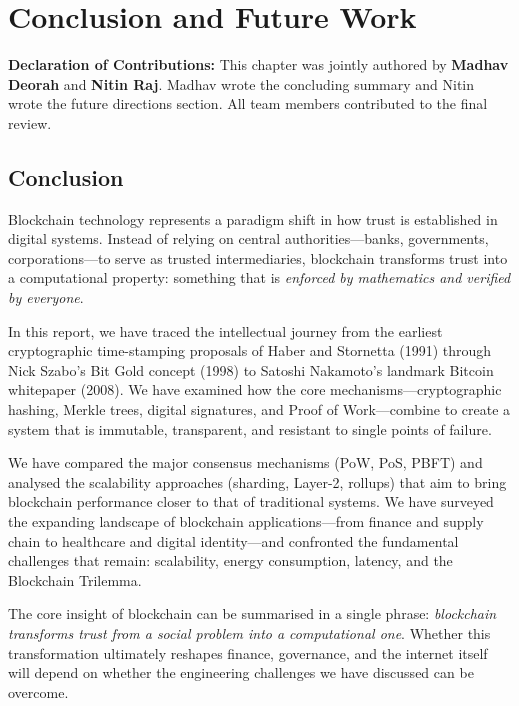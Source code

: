 \chapter{Conclusion and Future Work}
\label{ch:conclusion}

\noindent\textbf{Declaration of Contributions:} This chapter was jointly authored by \textbf{Madhav Deorah} and \textbf{Nitin Raj}. Madhav wrote the concluding summary and Nitin wrote the future directions section. All team members contributed to the final review.

\bigskip

\section{Conclusion}

Blockchain technology represents a paradigm shift in how trust is established in digital systems. Instead of relying on central authorities---banks, governments, corporations---to serve as trusted intermediaries, blockchain transforms trust into a computational property: something that is \emph{enforced by mathematics and verified by everyone}.

In this report, we have traced the intellectual journey from the earliest cryptographic time-stamping proposals of Haber and Stornetta (1991) through Nick Szabo's Bit Gold concept (1998) to Satoshi Nakamoto's landmark Bitcoin whitepaper (2008). We have examined how the core mechanisms---cryptographic hashing, Merkle trees, digital signatures, and Proof of Work---combine to create a system that is immutable, transparent, and resistant to single points of failure.

We have compared the major consensus mechanisms (PoW, PoS, PBFT) and analysed the scalability approaches (sharding, Layer-2, rollups) that aim to bring blockchain performance closer to that of traditional systems. We have surveyed the expanding landscape of blockchain applications---from finance and supply chain to healthcare and digital identity---and confronted the fundamental challenges that remain: scalability, energy consumption, latency, and the Blockchain Trilemma.

The core insight of blockchain can be summarised in a single phrase: \emph{blockchain transforms trust from a social problem into a computational one}. Whether this transformation ultimately reshapes finance, governance, and the internet itself will depend on whether the engineering challenges we have discussed can be overcome.

